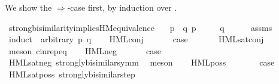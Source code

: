 \begin{isabellebody}
\begin{isamarkuptext}
We show the $\Longrightarrow$-case first, by induction over \isa{{\isasymphi}}.%
\end{isamarkuptext}\isamarkuptrue%
%
\isadelimvisible
%
\endisadelimvisible
%
\isatagvisible
{}\isamarkupfalse%
\ strong{\isacharunderscore}{\kern0pt}bisimilarity{\isacharunderscore}{\kern0pt}implies{\isacharunderscore}{\kern0pt}HM{\isacharunderscore}{\kern0pt}equivalence{\isacharcolon}{\kern0pt}\isanewline
\ \ \ {\isacartoucheopen}p\ {\isasymleftrightarrow}\ q{\isacartoucheclose}\ {\isacartoucheopen}p\ {\isasymTurnstile}\ {\isasymphi}{\isacartoucheclose}\isanewline
\ \ \ {\isacartoucheopen}q\ {\isasymTurnstile}\ {\isasymphi}{\isacartoucheclose}\isanewline
\ \ \isamarkupfalse%
\ assms\isanewline
{}\isamarkupfalse%
\ {\isacharparenleft}{\kern0pt}induct\ {\isasymphi}\ arbitrary{\isacharcolon}{\kern0pt}\ p\ q{\isacharparenright}{\kern0pt}\isanewline
\ \ \isamarkupfalse%
\ {\isacharparenleft}{\kern0pt}HML{\isacharunderscore}{\kern0pt}conj\ {\isasymPhi}{\isacharparenright}{\kern0pt}\isanewline
\ \ \isamarkupfalse%
\ \isamarkupfalse%
\ {\isacharquery}{\kern0pt}case\ \isanewline
\ \ \ \ \isamarkupfalse%
\ HML{\isacharunderscore}{\kern0pt}sat{\isacharunderscore}{\kern0pt}conj\ \isamarkupfalse%
\ {\isacharparenleft}{\kern0pt}meson\ cin{\isachardot}{\kern0pt}rep{\isacharunderscore}{\kern0pt}eq{\isacharparenright}{\kern0pt}\isanewline
{}\isamarkupfalse%
\isanewline
\ \ \isamarkupfalse%
\ {\isacharparenleft}{\kern0pt}HML{\isacharunderscore}{\kern0pt}neg\ {\isasymphi}{\isacharparenright}{\kern0pt}\isanewline
\ \ \isamarkupfalse%
\ \isamarkupfalse%
\ {\isacharquery}{\kern0pt}case\isanewline
\ \ \ \ \isamarkupfalse%
\ HML{\isacharunderscore}{\kern0pt}sat{\isacharunderscore}{\kern0pt}neg\ strongly{\isacharunderscore}{\kern0pt}bisimilar{\isacharunderscore}{\kern0pt}symm\ \isamarkupfalse%
\ meson\isanewline
{}\isamarkupfalse%
\isanewline
\ \ \isamarkupfalse%
\ {\isacharparenleft}{\kern0pt}HML{\isacharunderscore}{\kern0pt}poss\ {\isasymalpha}\ {\isasymphi}{\isacharparenright}{\kern0pt}\isanewline
\ \ \isamarkupfalse%
\ \isamarkupfalse%
\ {\isacharquery}{\kern0pt}case\isanewline
\ \ \ \ \isamarkupfalse%
\ HML{\isacharunderscore}{\kern0pt}sat{\isacharunderscore}{\kern0pt}poss\ strongly{\isacharunderscore}{\kern0pt}bisimilar{\isacharunderscore}{\kern0pt}step{\isacharparenleft}{\kern0pt}{}{\isacharparenright}{\kern0pt}\ \isamarkupfalse%

\end{isabellebody}
